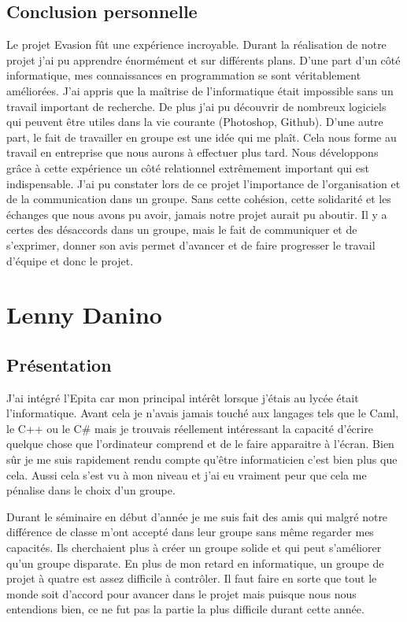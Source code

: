\documentclass[12pt]{article}
\begin{document}
\subsection{Conclusion personnelle}
Le projet Evasion fût une expérience incroyable. Durant la réalisation de notre projet j'ai pu apprendre énormément et sur différents plans. D'une part d'un côté informatique, mes connaissances en programmation se sont véritablement améliorées. J'ai appris que la maîtrise de l'informatique était impossible sans un travail important de recherche. De plus j'ai pu découvrir de nombreux logiciels qui peuvent être utiles dans la vie courante (Photoshop, Github). D'une autre part, le fait de travailler en groupe est une idée qui me plaît. Cela nous forme au travail en entreprise que nous aurons à effectuer plus tard. Nous développons grâce à cette expérience un côté relationnel extrêmement important qui est indispensable. J'ai pu constater lors de ce projet l'importance de l'organisation et de la communication dans un groupe. Sans cette cohésion, cette solidarité et les échanges que nous avons pu avoir, jamais notre projet aurait pu aboutir. Il y a certes des désaccords dans un groupe, mais le fait de communiquer et de s'exprimer, donner son avis permet d'avancer et de faire progresser le travail d'équipe et donc le projet.
\newpage

\section{Lenny Danino}

\subsection{Présentation}

J’ai intégré l’Epita car mon principal intérêt lorsque j’étais au lycée était l’informatique. Avant cela je n’avais jamais touché aux langages tels que le Caml, le C++ ou le C\# mais je trouvais réellement intéressant la capacité d’écrire quelque chose que l’ordinateur comprend et de le faire apparaitre à l’écran. Bien sûr je me suis rapidement rendu compte qu’être informaticien c’est bien plus que cela. Aussi cela s’est vu à mon niveau et j’ai eu vraiment peur que cela me pénalise dans le choix d’un groupe.

Durant le séminaire en début d’année je me suis fait des amis qui malgré notre différence de classe m’ont accepté dans leur groupe sans même regarder mes capacités. Ils cherchaient plus à créer un groupe solide et qui peut s’améliorer qu’un groupe disparate. En plus de mon retard en informatique, un groupe de projet à quatre est assez difficile à contrôler. Il faut faire en sorte que tout le monde soit d’accord pour avancer dans le projet mais puisque nous nous entendions bien, ce ne fut pas la partie la plus difficile durant cette année.
\end{document}
